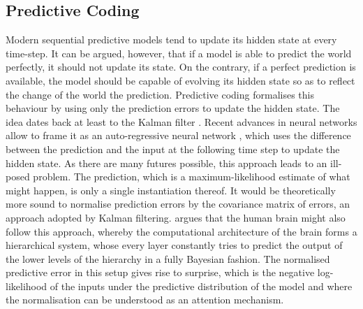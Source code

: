     \subsection{Predictive Coding}
    \label{sec:pred_coding}
        Modern sequential predictive models tend to update its hidden state at every time-step. It can be argued, however, that if a model is able to predict the world perfectly, it should not update its state. On the contrary, if a perfect prediction is available, the model should be capable of evolving its hidden state so as to reflect the change of the world \wrt the prediction. Predictive coding formalises this behaviour by using only the prediction errors to update the hidden state. The idea dates back at least to the Kalman filter \citep{Kalman1960}. Recent advances in neural networks allow to frame it as an auto-regressive neural network \citep{Lotter2016, Canziani2017}, which uses the difference between the prediction and the input at the following time step to update the hidden state. 
        As there are many futures possible, this approach leads to an ill-posed problem. The prediction, which is a maximum-likelihood estimate of what might happen, is only a single instantiation thereof. It would be theoretically more sound to normalise prediction errors by the covariance matrix of errors, an approach adopted by Kalman filtering. \cite{Friston2009guide} argues that 
        the human brain might also follow this approach, whereby the computational architecture of the brain forms a hierarchical system, whose every layer constantly tries to predict the output of the lower levels of the hierarchy in a fully Bayesian fashion. The normalised predictive error in this setup gives rise to surprise, which is the negative log-likelihood of the inputs under the predictive distribution of the model and where the normalisation can be understood as an attention mechanism.
%
%
